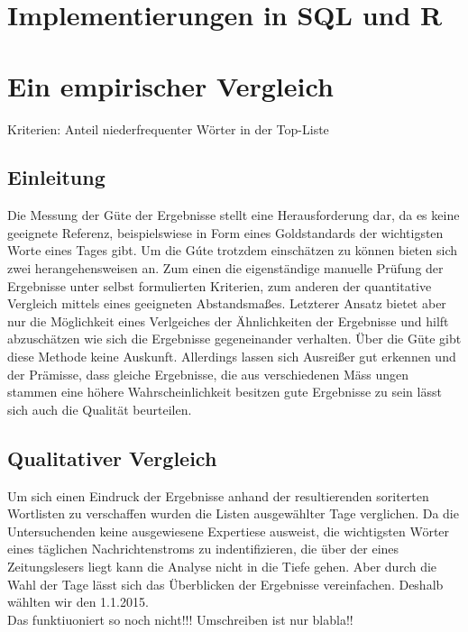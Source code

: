 \chapter{Implementierungen in SQL und R}



\chapter{Ein empirischer Vergleich}
 
Kriterien: Anteil niederfrequenter Wörter in der Top-Liste\\
\section{Einleitung}
Die Messung der G\"ute der Ergebnisse stellt eine Herausforderung dar, da es keine geeignete Referenz, beispielswiese in Form eines Goldstandards der wichtigsten Worte eines Tages gibt. Um die G\'ute trotzdem einsch\"atzen zu k\"onnen bieten sich zwei herangehensweisen an. Zum einen die eigenst\"andige manuelle Pr\"ufung der Ergebnisse unter selbst formulierten Kriterien, zum anderen der quantitative Vergleich mittels eines geeigneten Abstandsma\ss es. Letzterer Ansatz bietet aber nur die M\"oglichkeit eines Verlgeiches der \"Ahnlichkeiten der Ergebnisse und hilft abzusch\"atzen wie sich die Ergebnisse gegeneinander verhalten. \"Uber die G\"ute gibt diese Methode keine Auskunft. Allerdings lassen sich Ausrei\ss er gut erkennen und der Pr\"amisse, dass gleiche Ergebnisse, die aus verschiedenen M\"ass ungen stammen eine h\"ohere Wahrscheinlichkeit besitzen gute Ergebnisse zu sein l\"asst sich auch die Qualit\"at beurteilen.
\section{Qualitativer Vergleich}
Um sich einen Eindruck der Ergebnisse anhand der resultierenden soriterten Wortlisten zu verschaffen wurden die Listen ausgew\"ahlter Tage verglichen. Da die Untersuchenden keine ausgewiesene Expertiese ausweist, die wichtigsten W\"orter eines t\"aglichen Nachrichtenstroms zu indentifizieren, die \"uber der eines Zeitungslesers liegt kann die Analyse nicht in die Tiefe gehen. Aber durch die Wahl der Tage l\"asst sich das \"Uberblicken der Ergebnisse vereinfachen. Deshalb w\"ahlten wir den 1.1.2015. \\
 Das funktiuoniert so noch nicht!!! Umschreiben ist nur blabla!!
